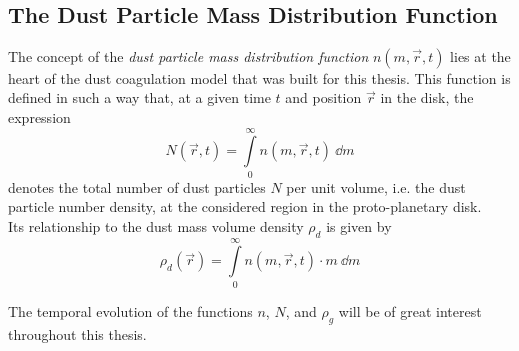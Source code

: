 \begin{figure}[h!]
\begin{minipage}{.5\linewidth}
{
          	}
        \end{minipage}
        \caption{
             \\ 
        }
        \label{}
    \end{figure}


\clearpage\subsection{The Dust Particle Mass Distribution Function}
\label{sec:dust_particle_mass_distribution}

    The concept of the \textit{dust particle mass distribution function} $n(m, \vec r, t)$ 
    lies at the heart of the dust coagulation model that was built for this thesis. 
    This function is defined in such a way that, at a given time $t$ and position $\vec r$ 
    in the disk, the expression
    \begin{equation}
        N(\vec r, t) =\int\limits_0^\infty n(m,\vec r, t)\ \dd m
    \end{equation}
    denotes the total number of dust particles $N$ per unit volume, i.e. the dust particle
    number density, at the considered region in the proto-planetary disk. \\

    Its relationship to the dust mass volume density $\rho_d$ is given by
    \begin{equation}
        \label{eq:relationship_between_dust_particle_mass_distribution_and_mass_volume_density}
        \rho_d(\vec r) =\int\limits_0^\infty n(m,\vec r, t)\cdot m\ \dd m
    \end{equation}

    The temporal evolution of the functions $n$, $N$, and $\rho_g$ will be of great interest 
    throughout this thesis.

